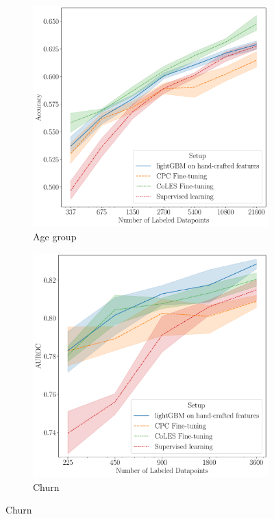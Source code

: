 \documentclass[sigconf]{acmart}
\begin{document}
\begin{figure}
  \centering
  \begin{subfigure}{0.25\linewidth}
    \caption{Age group}
    \includegraphics[width=\linewidth]{figures/ss_age_pred.pdf}
  \end{subfigure}%
  \begin{subfigure}{0.25\linewidth}
    \caption{Churn}
    \includegraphics[width=\linewidth]{figures/ss_rosbank.pdf}

\end{subfigure}
\end{figure}
\end{document}
